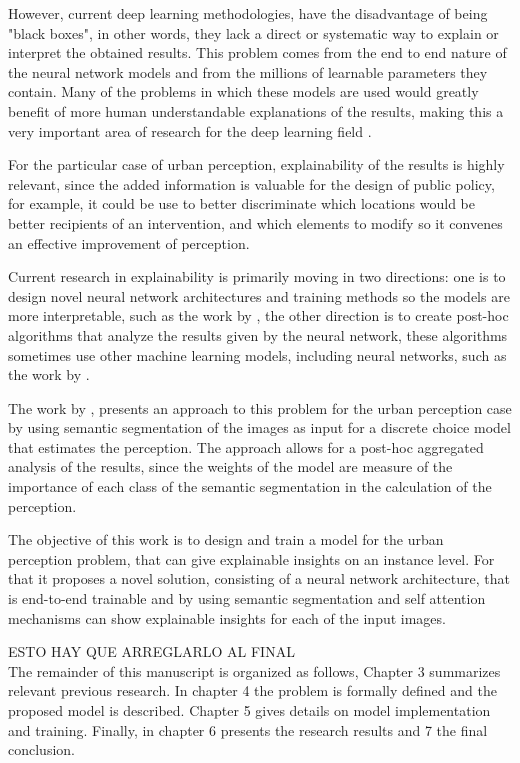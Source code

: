 However, current deep learning methodologies, have the disadvantage of being "black boxes", in other
words, they lack a direct or systematic way to explain or interpret the obtained results. This problem
comes from the end to end nature of the neural network models and from the millions of learnable parameters
they contain. Many of the problems in which these models are used would greatly benefit of more
human understandable explanations of the results, making this a very important area of
research for the deep learning field \cite{adadi_xai}.

For the particular case of urban perception, explainability of the results is highly relevant, since
the added information is valuable for the design of public policy, for example, it could be use to
better discriminate which locations would be better recipients of an intervention, and which elements
to modify so it convenes an effective improvement of perception.

Current research in explainability is primarily moving in two directions: one is to design novel neural network architectures and training methods so
the models are more interpretable, such as the work by , the other
direction is to  create post-hoc algorithms \cite{adadi_xai} that analyze the results given by the
neural network, these algorithms sometimes use other machine learning models, including neural networks,
such as the work by .

The work by , presents an approach to this problem for the urban perception case
by using semantic segmentation of the images \cite{segnet} as input for a discrete choice model that
estimates the perception. The approach allows for a post-hoc aggregated analysis of the results, since
the weights of the model are measure of the importance of each class of the semantic segmentation in the
calculation of the perception.

The objective of this work is to design and train a model for the urban perception problem,
that can give explainable insights on an instance level. For that it proposes a novel solution,
consisting of a neural network architecture, that is end-to-end trainable and by using semantic
segmentation \cite{pspnet} and self attention mechanisms \cite{vaswani_attention} can show
explainable insights for each of the input images.

ESTO HAY QUE ARREGLARLO AL FINAL \\
The remainder of this manuscript is organized as follows, Chapter 3 summarizes relevant previous research. In chapter 4
the problem is formally defined and the proposed model is described. Chapter 5 gives
details on model implementation and training. Finally, in chapter 6 presents the research results
and 7 the final conclusion.
